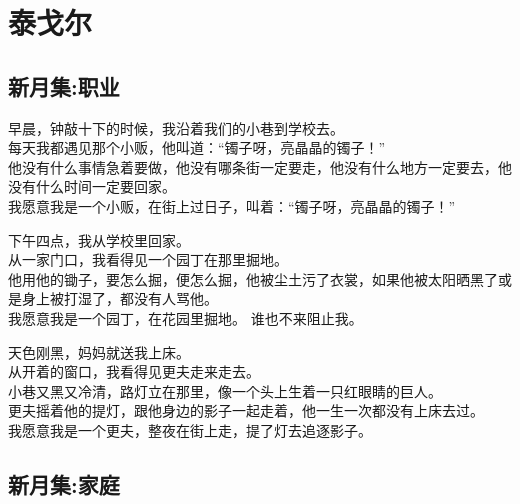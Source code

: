 \documentclass[]{book}
\renewenvironment{quote}{\begin{VF}}{\end{VF}}
\begin{document}
\chapter{泰戈尔}

\section{新月集:职业}

\begin{quote}
早晨，钟敲十下的时候，我沿着我们的小巷到学校去。\\
每天我都遇见那个小贩，他叫道：``镯子呀，亮晶晶的镯子！''\\
他没有什么事情急着要做，他没有哪条街一定要走，他没有什么地方一定要去，他没有什么时间一定要回家。\\
我愿意我是一个小贩，在街上过日子，叫着：``镯子呀，亮晶晶的镯子！''

下午四点，我从学校里回家。\\
从一家门口，我看得见一个园丁在那里掘地。\\
他用他的锄子，要怎么掘，便怎么掘，他被尘土污了衣裳，如果他被太阳晒黑了或是身上被打湿了，都没有人骂他。\\
我愿意我是一个园丁，在花园里掘地。 谁也不来阻止我。

天色刚黑，妈妈就送我上床。\\
从开着的窗口，我看得见更夫走来走去。\\
小巷又黑又冷清，路灯立在那里，像一个头上生着一只红眼睛的巨人。\\
更夫摇着他的提灯，跟他身边的影子一起走着，他一生一次都没有上床去过。\\
我愿意我是一个更夫，整夜在街上走，提了灯去追逐影子。
\end{quote}

\section{新月集:家庭}
\end{document}
